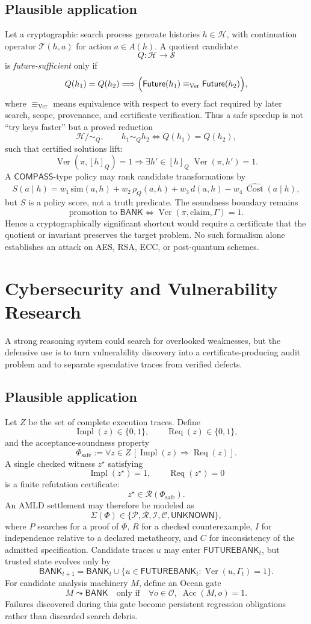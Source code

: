 \documentclass[11pt]{article}
\newcommand{\BANK}{\mathsf{BANK}}
\newcommand{\FB}{\mathsf{FUTUREBANK}}
\newcommand{\COMPASS}{\mathsf{COMPASS}}
\newcommand{\OCEAN}{\mathcal O}
\newcommand{\Req}{\operatorname{Req}}
\newcommand{\Impl}{\operatorname{Impl}}
\newcommand{\Acc}{\operatorname{Acc}}
\newcommand{\Ver}{\operatorname{Ver}}
\newcommand{\Cost}{\operatorname{Cost}}
\newcommand{\UNKNOWN}{\mathsf{UNKNOWN}}
\newcommand{\Pset}{\mathcal P}
\newcommand{\Rset}{\mathcal R}
\newcommand{\Iset}{\mathcal I}
\newcommand{\Cset}{\mathcal C}
\begin{document}
\subsection*{Plausible application}
Let a cryptographic search process generate histories \(h\in\mathcal H\), with continuation operator
\(\mathcal T(h,a)\) for action \(a\in A(h)\). A quotient candidate
\[
Q:\mathcal H\to\mathcal S
\]
is \emph{future-sufficient} only if
\[
Q(h_1)=Q(h_2)\Longrightarrow
\Bigl(\mathsf{Future}(h_1)\equiv_{\Ver}\mathsf{Future}(h_2)\Bigr),
\]
where \(\equiv_{\Ver}\) means equivalence with respect to every fact required by later search,
scope, provenance, and certificate verification. Thus a safe speedup is not ``try keys faster'' but
a proved reduction
\[
\mathcal H/\!\sim_Q,\qquad
h_1\sim_Q h_2 \iff Q(h_1)=Q(h_2),
\]
such that certified solutions lift:
\[
\Ver(\pi,[h]_Q)=1\Longrightarrow
\exists h'\in[h]_Q\;\Ver(\pi,h')=1.
\]
A \(\COMPASS\)-type policy may rank candidate transformations by
\[
S(a\mid h)=
w_1\,\mathrm{sim}(a,h)+w_2\,\rho_Q(a,h)+w_3\,d(a,h)
-w_4\,\widehat{\Cost}(a\mid h),
\]
but \(S\) is a policy score, not a truth predicate. The soundness boundary remains
\[
\text{promotion to }\BANK
\iff
\Ver(\pi,\text{claim},\Gamma)=1.
\]
Hence a cryptographically significant shortcut would require a certificate that the quotient or
invariant preserves the target problem. No such formalism alone establishes an attack on AES, RSA,
ECC, or post-quantum schemes.

\section{Cybersecurity and Vulnerability Research}
A strong reasoning system could search for overlooked weaknesses, but the defensive use is to turn
vulnerability discovery into a certificate-producing audit problem and to separate speculative traces
from verified defects.

\subsection*{Plausible application}
Let \(Z\) be the set of complete execution traces. Define
\[
\Impl(z)\in\{0,1\},\qquad \Req(z)\in\{0,1\},
\]
and the acceptance-soundness property
\[
\Phi_{\mathrm{safe}}
:=
\forall z\in Z\,[\Impl(z)\Rightarrow \Req(z)].
\]
A single checked witness \(z^\star\) satisfying
\[
\Impl(z^\star)=1,\qquad \Req(z^\star)=0
\]
is a finite refutation certificate:
\[
z^\star\in\Rset(\Phi_{\mathrm{safe}}).
\]
An AMLD settlement may therefore be modeled as
\[
\Sigma(\Phi)\in
\{\Pset,\Rset,\Iset,\Cset,\UNKNOWN\},
\]
where \(P\) searches for a proof of \(\Phi\), \(R\) for a checked counterexample,
\(I\) for independence relative to a declared metatheory, and \(C\) for inconsistency of the admitted
specification. Candidate traces \(u\) may enter \(\FB_t\), but trusted state evolves only by
\[
\BANK_{t+1}
=
\BANK_t\cup
\{u\in\FB_t:\Ver(u,\Gamma_t)=1\}.
\]
For candidate analysis machinery \(M\), define an Ocean gate
\[
M\leadsto\BANK
\quad\text{only if}\quad
\forall o\in\OCEAN,\;\Acc(M,o)=1.
\]
Failures discovered during this gate become persistent regression obligations rather than discarded
search debris.
\end{document}
